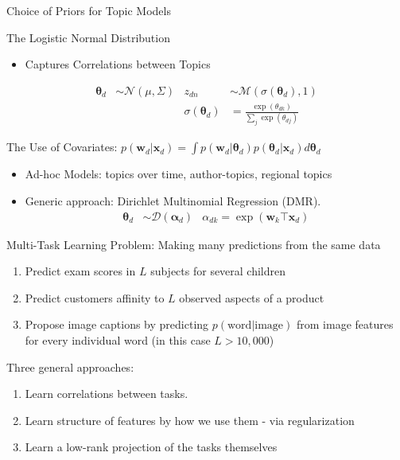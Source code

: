 \documentclass[xcolor=dvipsnames]{beamer}
\newcommand \vv[1] { \boldsymbol #1 }
\newcommand \wdoc      { { \vv{w}_d } }
\newcommand \thd[0]  { { \vv \theta_d } }
\newcommand \xd      { { \vv x_d } }
\newcommand \nor[2]   { \mathcal{N} \left( {#1}, {#2} \right) }
\newcommand \muln[2]  { \mathcal{M} \left( {#1},{#2} \right) }
\newcommand \dir[1]   { \mathcal{D} \left( {#1} \right) }
\newcommand \dir[1]   { \mathcal{D} \left( {#1} \right) }
\begin{document}


\begin{frame}{Choice of Priors for Topic Models}
 { 
    The Logistic Normal Distribution
    \begin{itemize}
            \item Captures Correlations between Topics\cite{Blei2006}
        \end{itemize}

        \begin{align*}
        \vv{\theta}_d & \sim \nor{\mu}{\Sigma} & z_{dn} &\sim \muln{\sigma(\vv{\theta}_d)}{1}\\
        & & \sigma(\vv{\theta}_d) & = \frac{\exp(\theta_{dk})}{\sum_j \exp(\theta_{dj})} 
        \end{align*}
    }
    
     { 
    The Use of Covariates: $p(\wdoc | \xd) = \int p(\wdoc|\thd) p(\thd|\xd) d\thd$
    \begin{itemize}
        \item Ad-hoc Models: topics over time\cite{Wang2006}, author-topics\cite{MacCallum2007}, regional topics\cite{Eisenstein2010}
        \item Generic approach: Dirichlet Multinomial Regression (DMR)\cite{Mimno2008}.
        \begin{align*}
        \vv{\theta}_d & \sim \dir{\vv{\alpha}_d} & \alpha_{dk} = \exp(\vv{w}_k\top\xd)
        \end{align*}

    \end{itemize} 
    }

\end{frame}




\begin{frame}{Multi-Task Learning}
Problem: Making many predictions from the same data
\begin{enumerate}
    \item Predict exam scores in $L$ subjects for several children\cite{Bonilla2008}
    \item Predict customers affinity to $L$ observed aspects of a product\cite{Allenby1999}
    \item Propose image captions by predicting $p(\text{word}|\text{image})$ from image features for every individual word (in this case $L > 10,000$)\cite{Archambeau2011}
\end{enumerate}

\medskip 
\pause

Three general approaches:\cite{Caruana1997}
\begin{enumerate}
    \item Learn correlations between tasks.
    \item Learn structure of features by how we use them - via regularization
    \item Learn a low-rank projection of the tasks themselves
\end{enumerate}
\end{frame}
\end{document}
